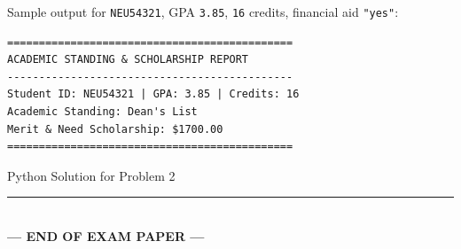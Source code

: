 \documentclass[11pt,a4paper]{article}
\begin{document}
Sample output for \texttt{NEU54321}, GPA \texttt{3.85}, \texttt{16} credits, financial aid \texttt{"yes"}:
\begin{lstlisting}
=============================================
ACADEMIC STANDING & SCHOLARSHIP REPORT
---------------------------------------------
Student ID: NEU54321 | GPA: 3.85 | Credits: 16
Academic Standing: Dean's List
Merit & Need Scholarship: $1700.00
=============================================
\end{lstlisting}

\begin{answerbox}[height=8.5cm]{Python Solution for Problem 2}
\end{answerbox}

\vfill
\begin{center}
  \rule{0.5\textwidth}{0.4pt}\\[1mm]
  \textbf{\color{primaryblue}--- END OF EXAM PAPER ---}
\end{center}
\end{document}
